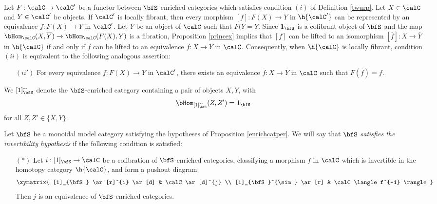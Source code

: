 \begin{remark}\label{dinty}
Let $F: \calC \rightarrow \calC'$ be a functor between $\bfS$-enriched categories
which satisfies condition $(i)$ of Definition \ref{twurp}. Let $X \in \calC$
and $Y \in \calC'$ be objects. If $\calC'$
is locally fibrant, then every morphism $[f]: F(X) \rightarrow Y$ in
$\h{\calC'}$ can be represented by an equivalence $f: F(X) \rightarrow Y$ in $\calC'$.
Let $\overline{Y}$ be an object of $\calC$ such that $F( \overline{Y} = Y$. Since
${\bf 1}_{\bfS}$ is a cofibrant object of $\bfS$ and the map
$\bHom_{\calC}( X, \overline{Y} ) \rightarrow \bHom_{\calC}( F(X), Y)$
is a fibration, Proposition \ref{princex} implies that $[f]$ can be lifted to
an isomorphism $[\overline{f}]: X \rightarrow \overline{Y}$ in $\h{\calC}$ if
and only if $f$ can be lifted to an equivalence $\overline{f}: X \rightarrow \overline{Y}$
in $\calC$. Consequently, when $\h{\calC}$ is locally fibrant,
condition $(ii)$ is equivalent to the following analogous assertion:
\begin{itemize}
\item[$(ii')$] For every equivalence $f: F(X) \rightarrow Y$ in $\calC'$, there
exists an equivalence $\overline{f}: X \rightarrow \overline{Y}$ in $\calC$
such that $F( \overline{f} ) = f$.
\end{itemize}
\end{remark}

\begin{notation}
We $[1]^{\sim}_{\bfS}$ denote the $\bfS$-enriched category
containing a pair of objects $X,Y$, with
$$ \bHom_{ [1]^{\sim}_{\bfS} }(Z, Z') = {\bf 1}_{\bfS}$$
for all $Z, Z' \in \{X, Y \}$. 
\end{notation}

\begin{definition}\label{inhyp}
Let $\bfS$ be a monoidal model category satisfying the hypotheses of Proposition
\ref{enrichcatper}. We will say that
$\bfS$ {\em satisfies the invertibility hypothesis} if the following condition is satisfied:
\begin{itemize}
\item[$(\ast)$] Let $i: [1]_{\bfS} \rightarrow \calC$ be a cofibration of $\bfS$-enriched
categories, classifying a morphism $f$ in $\calC$ which is invertible in the homotopy category $\h{\calC}$, and form a pushout diagram
$$ \xymatrix{ [1]_{\bfS} \ar[r]^{i} \ar[d] & \calC \ar[d]^{j} \\
[1]_{\bfS}^{\sim} \ar[r] & \calC\langle f^{-1} \rangle }$$ Then $j$ is an equivalence of $\bfS$-enriched categories.
\end{itemize}
\end{definition}

